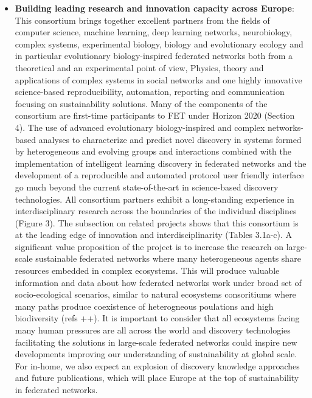 \documentclass[11pt, a4paper]{article} %
\begin{document}
\begin{itemize}
\item {\bf Building leading research and innovation capacity across Europe}:\\
  This consortium brings together excellent partners from the fields
  of computer science, machine learning, deep learning networks,
  neurobiology, complex systems, experimental biology, biology and
  evolutionary ecology and in particular evolutionary biology-inspired
  federated networks both from a theoretical and an experimental point
  of view, Physics, theory and applications of complex systems in
  social networks and one highly innovative science-based
  reproducibility, automation, reporting and communication focusing on
  sustainability solutions. Many of the components of the consortium
  are first-time participants to FET under Horizon 2020 (Section
  4). The use of advanced evolutionary biology-inspired and complex
  networks-based analyses to characterize and predict novel discovery
  in systems formed by heterogeneous and evolving groups and
  interactions combined with the implementation of intelligent
  learning discovery in federated networks and the development of a
  reproducible and automated protocol user friendly interface go much
  beyond the current state-of-the-art in science-based discovery
  technologies. All consortium partners exhibit a long-standing
  experience in interdisciplinary research across the boundaries of
  the individual disciplines (Figure 3). The subsection on related
  projects shows that this consortium is at the leading edge of
  innovation and interdisciplinarity (Tables 3.1a-c). A significant
  value proposition of the project is to increase the research on
  large-scale sustainable federated networks where many heterogeneous
  agents share resources embedded in complex ecosystems. This will
  produce valuable information and data about how federated networks
  work under broad set of socio-ecological scenarios, similar to
  natural ecosystems consoritiums where many paths produce coexistence
  of heterogneous poulations and high biodiversity (refs ++). It is
  important to consider that all ecosystems facing many human
  pressures are all across the world and discovery technologies
  facilitating the solutions in large-scale federated networks could
  inspire new developments improving our understanding of
  sustainability at global scale. For in-home, we also expect an
  explosion of discovery knowledge approaches and future publications,
  which will place Europe at the top of sustainability in federated
  networks.


\end{itemize}
\end{document}
